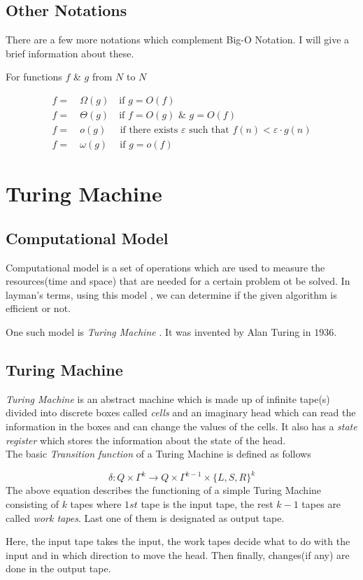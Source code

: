 \documentclass[12pt,a4paper]{extarticle}
\begin{document}
\subsection{Other Notations}
There are a few more notations which complement Big-O Notation. I will give a brief information about these.\par
For functions $f$ \& $g$ from $N$ to $N$

\begin{align}
f =&\:\Omega(g)\quad  \textrm{if} \,\,  g=O(f)\\
f =&\:\Theta(g)\quad \textrm{if} \,\,  f=O(g) \,\, \& \,\, g=O(f)\\
f =&\:o(g)\:\,\quad \textrm{if there exists }\varepsilon \textrm{ such that} \,\, f(n)<\varepsilon\cdot g(n) \\
f =&\:\omega(g)\quad \:\textrm{if} \,\,  g=o(f)
\end{align}

\section{Turing Machine}
\subsection{Computational Model}
Computational model is a set of operations which are used to measure the resources(time and space) that are needed for a certain problem ot be solved. In layman's terms, using this model , we can determine if the given algorithm is efficient or not. \par
One such model is \textit{Turing Machine} . It was invented by Alan Turing in $1936$. 
\subsection{Turing Machine}
\textit{Turing Machine} is an abstract machine which is made up of infinite tape(s) divided into discrete boxes called \textit{cells} and an imaginary head which can read the information in the boxes and can change the values of the cells. It also has a \textit{state register} which stores the information about the state of the head.\\
The basic \textit{Transition function} of a Turing Machine is defined as follows

\begin{equation}
\delta:Q\times\Gamma^k\longrightarrow Q\times\Gamma^{k-1}\times\{L,S,R\}^k
\end{equation}  
The above equation describes the functioning of a simple Turing Machine consisting of $k$ tapes where $1st$ tape is the input tape, the rest $k-1$ tapes are called \textit{work tapes}. Last one of them is designated as output tape.\par
Here, the input tape takes the input, the work tapes decide what to do with the input and in which direction to move the head. Then finally, changes(if any) are done in the output tape.\par
 
\end{document}
